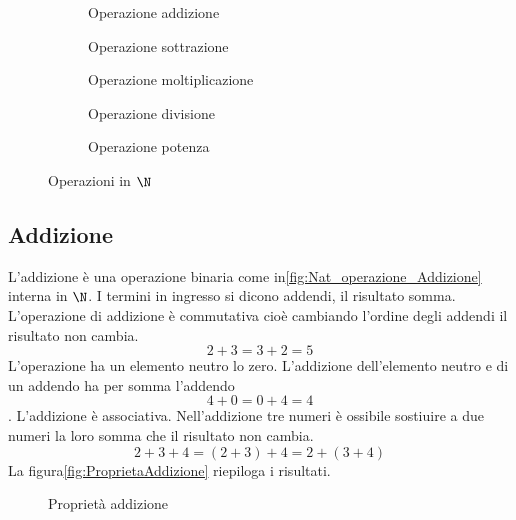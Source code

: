 \begin{figure} 
\begin{subfigure}[b]{.5\linewidth}
		\centering

	\caption{Operazione addizione}
	\label{fig:Nat_operazione_Addizione}
\end{subfigure}%
\begin{subfigure}[b]{.5\linewidth}
	\centering

	\caption{Operazione sottrazione}
	\label{fig:Nat_operazione_Sottrazione}
\end{subfigure}
	\begin{subfigure}[b]{.5\linewidth}
	\centering

	\caption{Operazione moltiplicazione}
	\label{fig:Nat_operazione_Moltiplicazione}
	\end{subfigure}
	\begin{subfigure}[b]{.5\linewidth}
	\centering

	\caption{Operazione divisione}
	\label{fig:Nat_operazione_Divisione}
	\end{subfigure}
		\begin{subfigure}[b]{.5\linewidth}
		\centering
	
		\caption{Operazione potenza}
		\label{fig:Nat_operazione_Potenza}
		\end{subfigure}
	\caption{Operazioni in $\N$}
	\label{fig:OperazioniinN}
\end{figure}
\subsection{Addizione}
\label{sec:NumerinatADD}
L'addizione è una operazione binaria come in\nobs\vref{fig:Nat_operazione_Addizione}  interna in $\N$. I termini in ingresso si dicono addendi, il risultato somma. L'operazione di  addizione è commutativa cioè cambiando l'ordine degli addendi il risultato non cambia. \[2+3=3+2=5\] L'operazione ha un elemento neutro lo zero. L'addizione dell'elemento neutro e di un addendo ha per somma l'addendo  \[4+0=0+4=4\]. L'addizione è associativa. Nell'addizione tre numeri è ossibile sostiuire a due numeri la loro somma che il risultato non  cambia.\[2+3+4=(2+3)+4=2+(3+4)\] La figura\nobs\vref{fig:ProprietaAddizione} riepiloga i risultati.
\begin{figure} %
	\centering

	\caption{Proprietà addizione}
	\label{fig:ProprietaAddizione}\end{figure}
